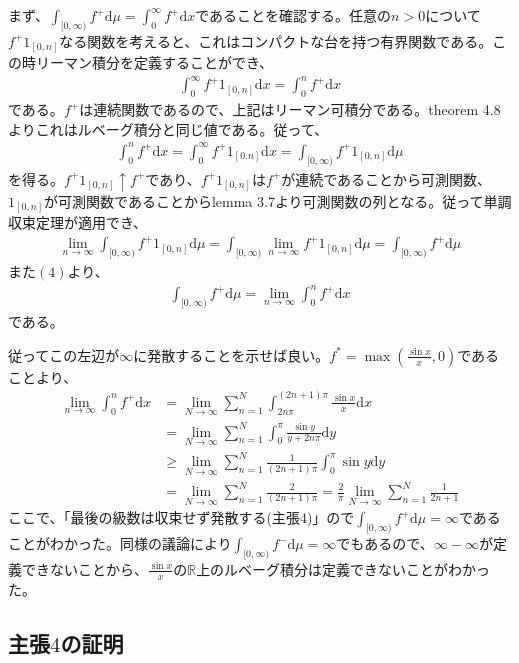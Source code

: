 \documentclass{article}
\begin{document}
まず、$\int_{[0, \infty)} f^{+} \mathrm{d}\mu = \int_0^{\infty} f^{+} \mathrm{d}x$であることを確認する。任意の$n > 0$について$f^{+} 1_{[0, n]}$なる関数を考えると、これはコンパクトな台を持つ有界関数である。この時リーマン積分を定義することができ、
\begin{align*}
	\int_0^{\infty} f^{+} 1_{[0, n]} \mathrm{d}x = \int_0^n f^{+}\mathrm{d}x
\end{align*}
である。$f^{+}$は連続関数であるので、上記はリーマン可積分である。theorem 4.8よりこれはルベーグ積分と同じ値である。従って、
\begin{align}
	\int_0^n f^{+} \mathrm{d}x = \int_0^{\infty} f^{+} 1_{[0. n]}\mathrm{d}x = \int_{[0, \infty)} f^{+}1_{[0, n]} \mathrm{d}\mu
\end{align}
を得る。$f^{+} 1_{[0, n]} \uparrow f^{+}$であり、$f^{+} 1_{[0, n]}$は$f^{+}$が連続であることから可測関数、$1_{[0, n]}$が可測関数であることからlemma 3.7より可測関数の列となる。従って単調収束定理が適用でき、
\begin{align*}
	\lim_{n\to \infty} \int_{[0, \infty)} f^{+} 1_{[0, n]} \mathrm{d}\mu = \int_{[0, \infty)} \lim_{n\to \infty} f^{+} 1_{[0, n]} \mathrm{d}\mu = \int_{[0, \infty)}  f^{+}  \mathrm{d}\mu
\end{align*}
また$(4)$より、
\begin{align*}
	\int_{[0, \infty)}  f^{+}  \mathrm{d}\mu = \lim_{n\to \infty} \int_0^n f^{+} \mathrm{d}x
\end{align*}
である。

従ってこの左辺が$\infty$に発散することを示せば良い。$f^{*} = \max \left( \frac{\sin x}{x}, 0 \right)$であることより、
\begin{align*}
	\lim_{n\to \infty} \int_0^n f^{+} \mathrm{d}x &= \lim_{N \to \infty} \sum_{n = 1}^{N} \int_{2n\pi}^{(2n + 1)\pi} \frac{\sin x}{x} \mathrm{d}x\\[8pt]
	&= \lim_{N \to \infty} \sum_{n = 1}^{N} \int_0^{\pi} \frac{\sin y}{y + 2n\pi} \mathrm{d}y\\[8pt]
	&\geq  \lim_{N \to \infty} \sum_{n = 1}^{N} \frac{1}{(2n+1)\pi} \int_0^{\pi} \sin y \mathrm{d}y\\[8pt]
	&= \lim_{N \to \infty} \sum_{n = 1}^{N} \frac{2}{(2n + 1)\pi} = \frac{2}{\pi} \lim_{N \to \infty} \sum_{n = 1}^{N} \frac{1}{2n + 1}
\end{align*}
ここで、「最後の級数は収束せず発散する(主張$4$)」ので$\int_{[0, \infty)}  f^{+}  \mathrm{d}\mu = \infty$であることがわかった。同様の議論により$\int_{[0, \infty)}  f^{-}  \mathrm{d}\mu = \infty$でもあるので、$\infty -\infty$が定義できないことから、$\frac{\sin x}{x}$の$\mathbb{R}$上のルベーグ積分は定義できないことがわかった。

\subsection{主張$4$の証明}
\end{document}
